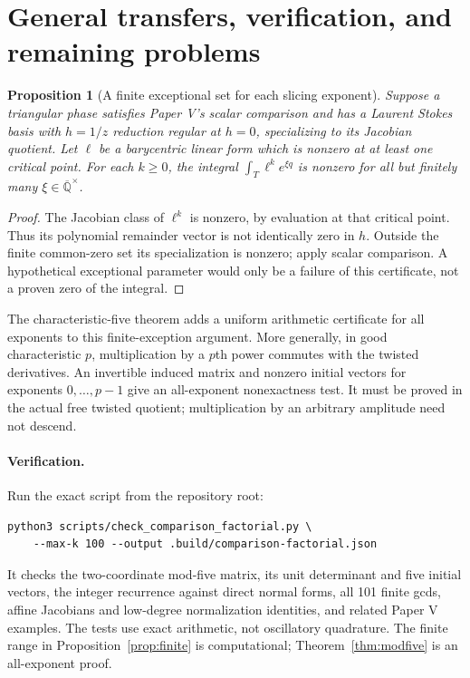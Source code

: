 \documentclass[11pt]{article}
\numberwithin{equation}{section}
\newtheorem{proposition}[proposition]{Proposition}
\theoremstyle{definition}
\theoremstyle{remark}
\newcommand{\Qbar}{\overline{\mathbb Q}}
\begin{document}
\section{General transfers, verification, and remaining problems}
\begin{proposition}[A finite exceptional set for each slicing exponent]
\label{prop:transfer}
Suppose a triangular phase satisfies Paper V's scalar comparison and has
a Laurent Stokes basis with $h=1/z$ reduction regular at $h=0$, specializing
to its Jacobian quotient. Let $\ell$ be a barycentric linear form which is
nonzero at at least one critical point. For each $k\ge0$, the integral
$\int_T\ell^k e^{\xi q}$ is nonzero for all but finitely many
$\xi\in\Qbar^\times$.
\end{proposition}
\begin{proof}
The Jacobian class of $\ell^k$ is nonzero, by evaluation at that critical
point. Thus its polynomial remainder vector is not identically zero in
$h$. Outside the finite common-zero set its specialization is nonzero;
apply scalar comparison. A hypothetical exceptional parameter would only
be a failure of this certificate, not a proven zero of the integral.
\end{proof}

The characteristic-five theorem adds a uniform arithmetic certificate for
all exponents to this finite-exception argument. More generally, in good
characteristic $p$, multiplication by a $p$th power commutes with the
twisted derivatives. An invertible induced matrix and nonzero initial
vectors for exponents $0,\ldots,p-1$ give an all-exponent nonexactness test.
It must be proved in the actual free twisted quotient; multiplication by an
arbitrary amplitude need not descend.

\paragraph{Verification.}
Run the exact script from the repository root:
\begin{verbatim}
python3 scripts/check_comparison_factorial.py \
    --max-k 100 --output .build/comparison-factorial.json
\end{verbatim}
It checks the two-coordinate mod-five matrix, its unit determinant and five
initial vectors, the integer recurrence against direct normal forms, all 101
finite gcds, affine Jacobians and low-degree normalization identities, and
related Paper V examples. The tests use exact arithmetic, not oscillatory
quadrature. The finite range in Proposition~\ref{prop:finite} is
computational; Theorem~\ref{thm:modfive} is an all-exponent proof.
\end{document}
